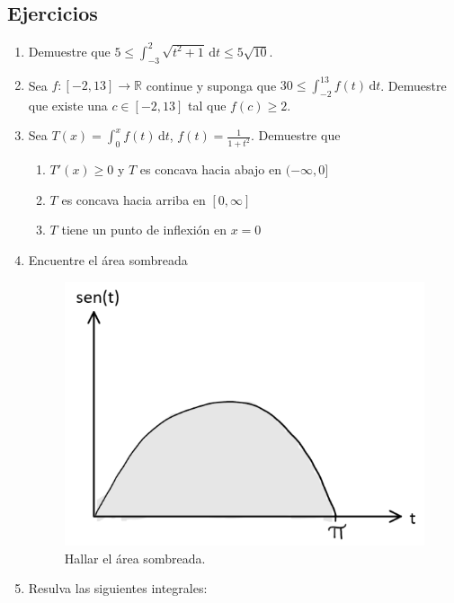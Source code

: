 \documentclass{article}
\numberwithin{equation}{section}
\newcommand{\col}[1]{\textcolor{ProcessBlue}{#1}}
\newcommand{\integrate}[4]{\int_{#1}^{#2} \! {#3} \, \mathrm{d} {#4} }
\begin{document}
\subsection{\col{Ejercicios}}

\begin{enumerate}
    \item Demuestre que $5\leq \integrate{-3}{2}{\sqrt{t^2+1}}{t}\leq 5\sqrt{10}$.
    \item Sea $f:[-2,13]\to\mathbb{R}$ continue y suponga que $30 \leq \integrate{-2}{13}{f(t)}{t}$. Demuestre que existe una $c\in[-2,13]$ tal que $f(c)\geq 2$.
    \item Sea $T(x)=\integrate{0}{x}{f(t)}{t}$, $f(t)=\frac{1}{1+t^2}$. Demuestre que
        \begin{enumerate}
            \item $T'(x)\geq 0$ y $T$ es concava hacia abajo en $(-\infty,0]$
            \item $T$ es concava hacia arriba en $[0,\infty]$
            \item $T$ tiene un punto de inflexión en $x=0$
        \end{enumerate}
    \item Encuentre el área sombreada
        \begin{figure}[H]
            \centering
            \includegraphics[scale=0.4]{images/fig10.png}
            \caption{Hallar el área sombreada.}
            \label{fig:fig10}
        \end{figure}  
    \item Resulva las siguientes integrales:
        \begin{multicols}{2}

\end{multicols}
\end{enumerate}
\end{document}
